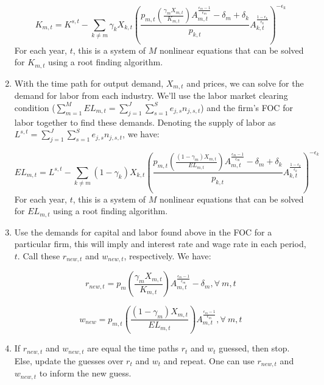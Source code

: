 \documentclass[letterpaper,12pt]{article}
\theoremstyle{definition}
\begin{document}
\begin{spacing}{1.5}
\begin{enumerate}
	\begin{equation}
	K_{m,t} = K^{s,t} - \sum_{k \neq m} \gamma_{k}X_{k,t}\left(\frac{p_{m,t}\left(\frac{\gamma_{m}X_{m,t}}{K_{m,t}}\right)A_{m,t}^{\frac{\epsilon_{m}-1}{\epsilon_{m}}}-\delta_{m}+\delta_{k}}{p_{k,t}}A_{k,t}^{\frac{1-\epsilon_{k}}{\epsilon_{k}}}\right)^{-\epsilon_{k}}
	\end{equation}
	For each year, $t$, this is a system of $M$ nonlinear equations that can be solved for $K_{m,t}$ using a root finding algorithm.
	
\item With the time path for output demand, $X_{m,t}$ and prices, we can solve for the demand for labor from each industry.  We'll use the labor market clearing condition ($\sum_{m=1}^{M} EL_{m,t}=\sum_{j=1}^{J}\sum_{s=1}^{S}e_{j,s} n_{j,s,t}$) and the firm's FOC for labor together to find these demands.  Denoting the supply of labor as $L^{s,t}=\sum_{j=1}^{J}\sum_{s=1}^{S} e_{j,s}n_{j,s,t}$, we have:

	\begin{equation}
	EL_{m,t} = L^{s,t} - \sum_{k\neq m} (1- \gamma_{k})X_{k,t}\left(\frac{p_{m,t}\left(\frac{(1-\gamma_{m})X_{m,t}}{EL_{m,t}}\right)A_{m,t}^{\frac{\epsilon_{m}-1}{\epsilon_{m}}}-\delta_{m}+\delta_{k}}{p_{k,t}}A_{k,t}^{\frac{1-\epsilon_{k}}{\epsilon_{k}}}\right)^{-\epsilon_{k}}
	\end{equation}
	For each year, $t$, this is a system of $M$ nonlinear equations that can be solved for $EL_{m,t}$ using a root finding algorithm.
	
\item Use the demands for capital and labor found above in the FOC for a particular firm, this will imply and interest rate and wage rate in each period, $t$.  Call these $r_{new,t}$ and $w_{new,t}$, respectively.  We have:

	\begin{equation}
	r_{new,t} = p_{m}\left(\frac{\gamma_{m}X_{m,t}}{K_{m,t}}\right)A_{m,t}^{\frac{\epsilon_{m}-1}{\epsilon_{m}}}-\delta_{m}, \forall \ m, t
	\end{equation}

	\begin{equation}
	w_{new} = p_{m,t}\left(\frac{(1-\gamma_{m})X_{m,t}}{EL_{m,t}}\right)A_{m,t}^{\frac{\epsilon_{m}-1}{\epsilon_{m}}}, \forall \ m, t
	\end{equation}

\item If $r_{new,t}$ and $w_{new,t}$ are equal the time paths $r_{t}$ and $w_{t}$ guessed, then stop.  Else, update the guesses over $r_{t}$ and $w_{t}$ and repeat.  One can use $r_{new,t}$ and $w_{new,t}$ to inform the new guess. 

\end{enumerate}

\end{spacing}
\end{document}
